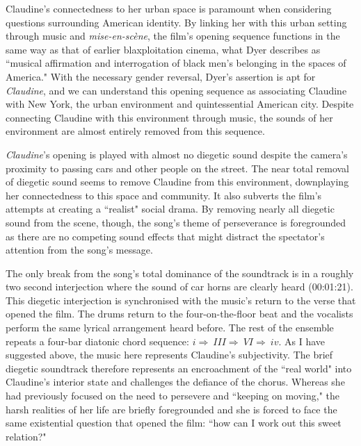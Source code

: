Claudine's connectedness to her urban space is paramount when considering questions surrounding American identity.
By linking her with this urban setting through music and \textit{mise-en-scène}, the film's opening sequence functions in the same way as that of earlier blaxploitation cinema, what Dyer describes as ``musical affirmation and interrogation of black men's belonging in the spaces of America."\autocite[][173]{dyer_space_2012}
With the necessary gender reversal, Dyer's assertion is apt for \textit{Claudine}, and we can understand this opening sequence as associating Claudine with New York, the urban environment and quintessential American city.
Despite connecting Claudine with this environment through music, the sounds of her environment are almost entirely removed from this sequence.

\textit{Claudine}'s opening is played with almost no diegetic sound despite the camera's proximity to passing cars and other people on the street.
The near total removal of diegetic sound seems to remove Claudine from this environment, downplaying her connectedness to this space and community.
It also subverts the film's attempts at creating a ``realist" social drama.
By removing nearly all diegetic sound from the scene, though, the song's theme of perseverance is foregrounded as there are no competing sound effects that might distract the spectator's attention from the song's message.

The only break from the song's total dominance of the soundtrack is in a roughly two second interjection where the sound of car horns are clearly heard (00:01:21).
This diegetic interjection is synchronised with the music's return to the verse that opened the film.
The drums return to the four-on-the-floor beat and the vocalists perform the same lyrical arrangement heard before.
The rest of the ensemble repeats a four-bar diatonic chord sequence: \(i\Rightarrow\ III \Rightarrow\ VI\Rightarrow\ iv.\)
As I have suggested above, the music here represents Claudine's subjectivity.
The brief diegetic soundtrack therefore represents an encroachment of the ``real world" into Claudine's interior state and challenges the defiance of the chorus.
Whereas she had previously focused on the need to persevere and ``keeping on moving," the harsh realities of her life are briefly foregrounded and she is forced to face the same existential question that opened the film:
``how can I work out this sweet relation?"

